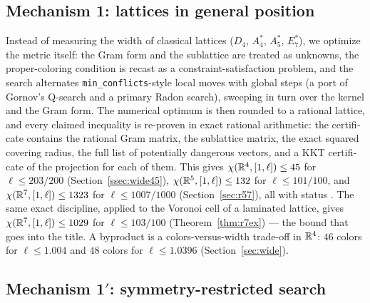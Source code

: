 \begin{otherlanguage}{english}
\subsection*{Mechanism 1: lattices in general position}

Instead of measuring the width of classical lattices ($D_4$, $A_4^*$,
$A_5^*$, $E_7^*$), we optimize the metric itself: the Gram form and the
sublattice are treated as unknowns, the proper-coloring condition is recast
as a constraint-satisfaction problem, and the search alternates
\texttt{min\_conflicts}-style local moves with global steps (a port of
Gornov's Q-search and a primary Radon search), sweeping in turn over the
kernel and the Gram form. The numerical optimum is then rounded to a
rational lattice, and every claimed inequality is re-proven in exact
rational arithmetic: the certificate contains the rational Gram matrix, the
sublattice matrix, the exact squared covering radius, the full list of
potentially dangerous vectors, and a KKT certificate of the projection for
each of them. This gives $\chi(\mathbb{R}^4,[1,\ell])\le45$ for $\ell\le203/200$
(Section~\ref{ssec:wide45}), $\chi(\mathbb{R}^5,[1,\ell])\le132$ for $\ell\le101/100$,
and $\chi(\mathbb{R}^7,[1,\ell])\le1323$ for $\ell\le1007/1000$
(Section~\ref{sec:r57}), all with status \stC. The same exact discipline,
applied to the Voronoi cell of a laminated lattice, gives
$\chi(\mathbb{R}^7,[1,\ell])\le1029$ for $\ell\le103/100$
(Theorem~\ref{thm:r7ex}) --- the bound that goes into the title. A byproduct is a
colors-versus-width trade-off in $\mathbb{R}^4$: $46$ colors for $\ell\le1.004$ and
$48$ colors for $\ell\le1.0396$ (Section~\ref{sec:wide}).

\subsection*{Mechanism 1$'$: symmetry-restricted search}


\end{otherlanguage}
